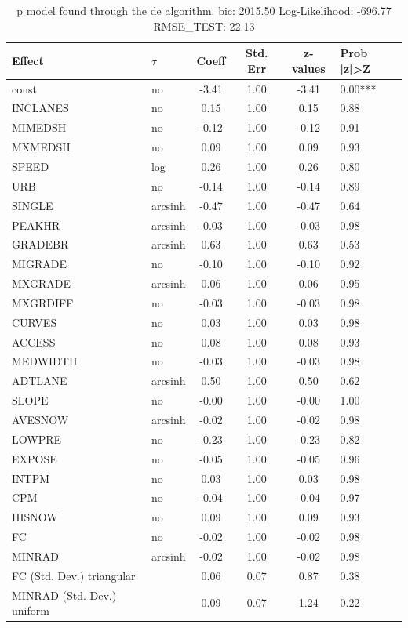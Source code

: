\begin{table}
	\caption{p model found through the de algorithm. bic: 2015.50 Log-Likelihood: -696.77 RMSE_TEST: 22.13}
	\begin{center}
		\begin{tabular}{|l|l|c|c|c|l|}
			\hline
			Effect & $\tau$ & Coeff & Std. Err & z-values & Prob |z|>Z \\
			\hline
			const & no & -3.41 & 1.00 & -3.41 & 0.00*** \\
			\hline
			INCLANES & no & 0.15 & 1.00 & 0.15 & 0.88 \\
			\hline
			MIMEDSH & no & -0.12 & 1.00 & -0.12 & 0.91 \\
			\hline
			MXMEDSH & no & 0.09 & 1.00 & 0.09 & 0.93 \\
			\hline
			SPEED & log & 0.26 & 1.00 & 0.26 & 0.80 \\
			\hline
			URB & no & -0.14 & 1.00 & -0.14 & 0.89 \\
			\hline
			SINGLE & arcsinh & -0.47 & 1.00 & -0.47 & 0.64 \\
			\hline
			PEAKHR & arcsinh & -0.03 & 1.00 & -0.03 & 0.98 \\
			\hline
			GRADEBR & arcsinh & 0.63 & 1.00 & 0.63 & 0.53 \\
			\hline
			MIGRADE & no & -0.10 & 1.00 & -0.10 & 0.92 \\
			\hline
			MXGRADE & arcsinh & 0.06 & 1.00 & 0.06 & 0.95 \\
			\hline
			MXGRDIFF & no & -0.03 & 1.00 & -0.03 & 0.98 \\
			\hline
			CURVES & no & 0.03 & 1.00 & 0.03 & 0.98 \\
			\hline
			ACCESS & no & 0.08 & 1.00 & 0.08 & 0.93 \\
			\hline
			MEDWIDTH & no & -0.03 & 1.00 & -0.03 & 0.98 \\
			\hline
			ADTLANE & arcsinh & 0.50 & 1.00 & 0.50 & 0.62 \\
			\hline
			SLOPE & no & -0.00 & 1.00 & -0.00 & 1.00 \\
			\hline
			AVESNOW & arcsinh & -0.02 & 1.00 & -0.02 & 0.98 \\
			\hline
			LOWPRE & no & -0.23 & 1.00 & -0.23 & 0.82 \\
			\hline
			EXPOSE & no & -0.05 & 1.00 & -0.05 & 0.96 \\
			\hline
			INTPM & no & 0.03 & 1.00 & 0.03 & 0.98 \\
			\hline
			CPM & no & -0.04 & 1.00 & -0.04 & 0.97 \\
			\hline
			HISNOW & no & 0.09 & 1.00 & 0.09 & 0.93 \\
			\hline
			FC & no & -0.02 & 1.00 & -0.02 & 0.98 \\
			\hline
			MINRAD & arcsinh & -0.02 & 1.00 & -0.02 & 0.98 \\
			\hline
			FC (Std. Dev.) triangular &  & 0.06 & 0.07 & 0.87 & 0.38 \\
			\hline
			MINRAD (Std. Dev.) uniform &  & 0.09 & 0.07 & 1.24 & 0.22 \\
			\hline
		\end{tabular}
	\end{center}
\end{table}